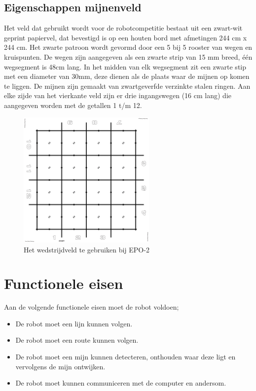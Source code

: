 \documentclass{report}
\begin{document}
\subsection{Eigenschappen mijnenveld}

Het veld dat gebruikt wordt voor de robotcompetitie bestaat uit een zwart-wit geprint papiervel, dat bevestigd is op een houten bord met afmetingen 244 cm x 244 cm.
Het zwarte patroon wordt gevormd door een 5 bij 5 rooster van wegen en kruispunten.
De wegen zijn aangegeven als een zwarte strip van 15 mm breed, één wegsegment is 48cm lang.
In het midden van elk wegsegment zit een zwarte stip met een diameter van 30mm, deze dienen als de plaats waar de mijnen op komen te liggen.
De mijnen zijn gemaakt van zwartgeverfde verzinkte stalen ringen.
Aan elke zijde van het vierkante veld zijn er drie ingangswegen (16 cm lang) die aangegeven worden met de getallen 1 t/m 12.


\begin{figure}[H]
	\centering
	\includegraphics[width=0.6\textwidth]{competitionField2440x2440-rc.pdf}
	\caption{Het wedstrijdveld te gebruiken bij EPO-2}
	\label{fig:field}
\end{figure}


\section{Functionele eisen}

Aan de volgende functionele eisen moet de robot voldoen;

\begin{itemize}

\item
De robot moet een lijn kunnen volgen.


\item 
De robot moet een route kunnen volgen.

\item
De robot moet een mijn kunnen detecteren, onthouden waar deze ligt en vervolgens de mijn ontwijken.

\item 
De robot moet kunnen communiceren met de computer en andersom.

\end{itemize}
\end{document}
